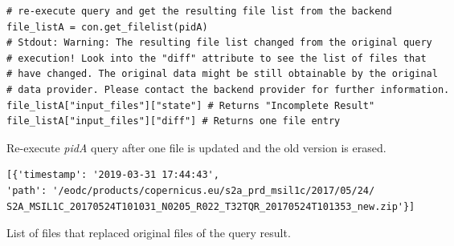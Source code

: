 \documentclass[draft,final]{vutinfth} %
\newenvironment{code}{\captionsetup{type=listing}}{}
\begin{document}
\begin{enumerate}
	\begin{code}
		\begin{verbatim}
# re-execute query and get the resulting file list from the backend
file_listA = con.get_filelist(pidA)
# Stdout: Warning: The resulting file list changed from the original query
# execution! Look into the "diff" attribute to see the list of files that
# have changed. The original data might be still obtainable by the original 
# data provider. Please contact the backend provider for further information.
file_listA["input_files"]["state"] # Returns "Incomplete Result"
file_listA["input_files"]["diff"] # Returns one file entry
		\end{verbatim}
		\caption{Re-execute \textit{pidA} query after one file is updated and the old version is erased.}
		\label{lst:eva_datachange_7}
	\end{code}	
	
	\begin{code}
		\begin{verbatim} 
[{'timestamp': '2019-03-31 17:44:43', 
'path': '/eodc/products/copernicus.eu/s2a_prd_msil1c/2017/05/24/
S2A_MSIL1C_20170524T101031_N0205_R022_T32TQR_20170524T101353_new.zip'}]
		\end{verbatim}
		\caption{List of files that replaced original files of the query result.}
		\label{lst:eva_datachange_state}
	\end{code}


\end{enumerate}
\end{document}
